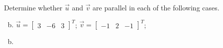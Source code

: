 \documentclass[../main.tex]{subfiles}
\begin{document}
Determine whether $\vec{u}$ and $\vec{v}$ are parallel in each of the following cases.
\begin{enumerate}[a)]
	\setcounter{enumi}{1}
	\item $\vec{u} = \begin{bmatrix}3&-6&3\end{bmatrix}^T$; $\vec{v} = \begin{bmatrix}-1&2&-1\end{bmatrix}^T$;
\end{enumerate}

\solution
\begin{enumerate}[a)]
	\setcounter{enumi}{1}
	\item 
\end{enumerate}
\end{document}
